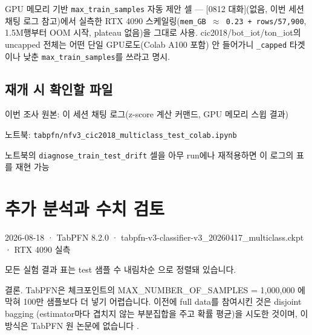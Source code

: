 \par\noindent \textbullet\enspace GPU 메모리 기반 \texttt{max\_\allowbreak{}\allowbreak{}trai\allowbreak{}n\_\allowbreak{}\allowbreak{}sample\allowbreak{}s} 자동 제안 셀 — [0812 대화](없음, 이번 세션 채팅 로그 참고)에서 실측한 RTX 4090 스케일링(\texttt{mem\_\allowbreak{}\allowbreak{}GB \ensuremath{\approx}\allowbreak{} 0.\allowbreak{}23 +\allowbreak{}\allowbreak{} \allowbreak{}rows/\allowbreak{}\allowbreak{}57,\allowbreak{}900}, 1.5M행부터 OOM 시작, plateau 없음)을 그대로 사용. cic2018/\allowbreak{}bot\_\allowbreak{}iot/\allowbreak{}ton\_\allowbreak{}iot의 uncapped 전체는 어떤 단일 GPU로도(Colab A100 포함) 안 들어가니 \texttt{\_\allowbreak{}\allowbreak{}capped} 타겟이나 낮춘 \texttt{max\_\allowbreak{}\allowbreak{}trai\allowbreak{}n\_\allowbreak{}\allowbreak{}sample\allowbreak{}s}를 쓰라고 명시.


\subsection{재개 시 확인할 파일}
\par\noindent \textbullet\enspace 이번 조사 원본: 이 세션 채팅 로그(z-score 계산 커맨드, GPU 메모리 스윕 결과)


\par\noindent \textbullet\enspace 노트북: \texttt{tabpfn/\allowbreak{}\allowbreak{}n\allowbreak{}fv3\_\allowbreak{}\allowbreak{}cic2\allowbreak{}018\_\allowbreak{}\allowbreak{}mult\allowbreak{}iclass\_\allowbreak{}\allowbreak{}t\allowbreak{}est\_\allowbreak{}\allowbreak{}cola\allowbreak{}b.\allowbreak{}ipynb}


\par\noindent \textbullet\enspace 노트북의 \texttt{diagnose\allowbreak{}\_\allowbreak{}\allowbreak{}train\_\allowbreak{}\allowbreak{}t\allowbreak{}est\_\allowbreak{}\allowbreak{}drif\allowbreak{}t} 셀을 아무 run에나 재적용하면 이 로그의 표를 재현 가능




\section{추가 분석과 수치 검토}
2026-08-18 · TabPFN 8.2.0 · tabpfn-v3-classifier-v3\_\allowbreak{}20260417\_\allowbreak{}multiclass.ckpt · RTX 4090 실측

모든 실험 결과 표는 test 샘플 수 내림차순 으로 정렬돼 있습니다.

결론. TabPFN은 체크포인트의 MAX\_\allowbreak{}NUMBER\_\allowbreak{}OF\_\allowbreak{}SAMPLES =\allowbreak{} 1,000,000 에 막혀 100만 샘플보다 더 넣기 어렵습니다. 이전에 full data를 참여시킨 것은 disjoint bagging (estimator마다 겹치지 않는 부분집합을 주고 확률 평균)을 시도한 것이며, 이 방식은 TabPFN 원 논문에 없습니다 .

